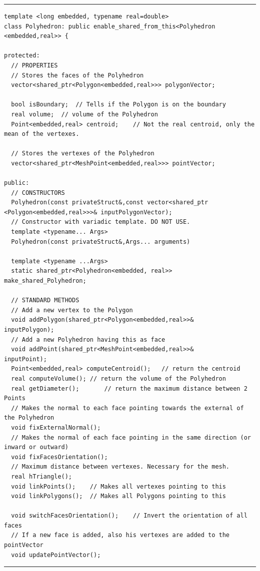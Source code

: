 \noindent\rule{12.7cm}{1pt}
\begin{lstlisting}[caption=File \texttt{Polyhedron.h}]
template <long embedded, typename real=double>
class Polyhedron: public enable_shared_from_this<Polyhedron
<embedded,real>> {

protected:
  // PROPERTIES
  // Stores the faces of the Polyhedron
  vector<shared_ptr<Polygon<embedded,real>>> polygonVector; 
	
  bool isBoundary;	// Tells if the Polygon is on the boundary
  real volume;	// volume of the Polyhedron
  Point<embedded,real> centroid;	// Not the real centroid, only the mean of the vertexes.

  // Stores the vertexes of the Polyhedron
  vector<shared_ptr<MeshPoint<embedded,real>>> pointVector;	

public:
  // CONSTRUCTORS
  Polyhedron(const privateStruct&,const vector<shared_ptr
<Polygon<embedded,real>>>& inputPolygonVector);
  // Constructor with variadic template. DO NOT USE.
  template <typename... Args>
  Polyhedron(const privateStruct&,Args... arguments)

  template <typename ...Args>
  static shared_ptr<Polyhedron<embedded, real>>
make_shared_Polyhedron;

  // STANDARD METHODS
  // Add a new vertex to the Polygon
  void addPolygon(shared_ptr<Polygon<embedded,real>>& 
inputPolygon);
  // Add a new Polyhedron having this as face
  void addPoint(shared_ptr<MeshPoint<embedded,real>>& 
inputPoint);
  Point<embedded,real> computeCentroid();	// return the centroid
  real computeVolume();	// return the volume of the Polyhedron
  real getDiameter();		// return the maximum distance between 2 Points
  // Makes the normal to each face pointing towards the external of the Polyhedron
  void fixExternalNormal();	
  // Makes the normal of each face pointing in the same direction (or inward or outward)
  void fixFacesOrientation();	
  // Maximum distance between vertexes. Necessary for the mesh.
  real hTriangle();	
  void linkPoints();	// Makes all vertexes pointing to this
  void linkPolygons();  // Makes all Polygons pointing to this

  void switchFacesOrientation();	// Invert the orientation of all faces
  // If a new face is added, also his vertexes are added to the pointVector
  void updatePointVector();
\end{lstlisting}
\noindent\rule{12.7cm}{1pt}\\

